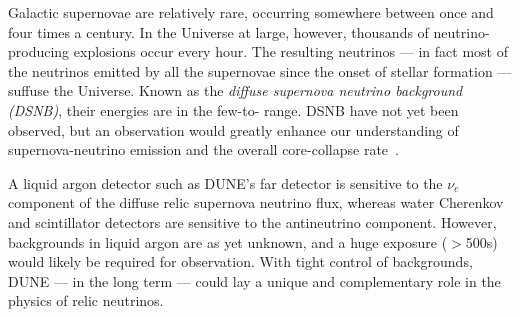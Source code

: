 Galactic supernovae are relatively rare, occurring somewhere between
once and four times a century. In the Universe
at large, however, thousands of neutrino-producing explosions occur
every hour.  The resulting neutrinos --- in fact most of the neutrinos
emitted by all the supernovae since the onset of stellar formation ---
suffuse the Universe.  Known as the \emph{diffuse supernova neutrino background
  (DSNB)}, their energies are in the few-to- range.  DSNB
have not yet been observed, but an observation would greatly enhance
our understanding of supernova-neutrino emission and the overall
core-collapse rate~\cite{Beacom:2010kk}.


A liquid argon detector such as DUNE's far detector is sensitive to
the $\nu_e$ component of the diffuse relic supernova neutrino flux,
whereas water Cherenkov and scintillator detectors are sensitive to
the antineutrino component.  However, backgrounds in liquid argon are as
yet unknown, and a huge exposure ($>$\SI{500}{\ktyr}s)
would likely be required for observation.  
With tight control of
backgrounds, %
DUNE --- in the long term --- could %
lay a unique and
 complementary role in the physics of relic neutrinos.

%


